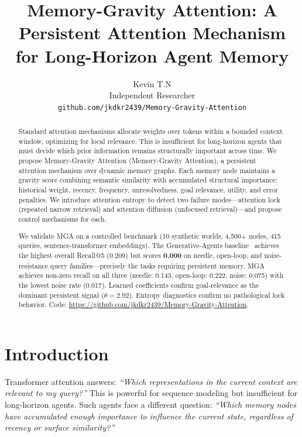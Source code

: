 \documentclass{article}
\title{Memory-Gravity Attention: A Persistent Attention Mechanism\\for Long-Horizon Agent Memory}
\author{
  Kevin T.N \\
  Independent Researcher \\
  \texttt{github.com/jkdkr2439/Memory-Gravity-Attention}
}
\newcommand{\MGA}{Memory-Gravity Attention}
\begin{document}
\maketitle

\begin{abstract}
Standard attention mechanisms allocate weights over tokens within a bounded context window, optimizing for local relevance. This is insufficient for long-horizon agents that must decide which prior information remains structurally important across time. We propose \MGA{} (\MGA{}), a persistent attention mechanism over dynamic memory graphs. Each memory node maintains a gravity score combining semantic similarity with accumulated structural importance: historical weight, recency, frequency, unresolvedness, goal relevance, utility, and error penalties. We introduce attention entropy to detect two failure modes---attention lock (repeated narrow retrieval) and attention diffusion (unfocused retrieval)---and propose control mechanisms for each.

We validate MGA on a controlled benchmark (10 synthetic worlds, 4{,}500+ nodes, 415 queries, sentence-transformer embeddings). The Generative-Agents baseline~\citep{park2023generative} achieves the highest overall Recall@5 (0.209) but scores \textbf{0.000} on needle, open-loop, and noise-resistance query families---precisely the tasks requiring persistent memory. MGA achieves non-zero recall on all three (needle: 0.143, open-loop: 0.222, noise: 0.075) with the lowest noise rate (0.017). Learned coefficients confirm goal-relevance as the dominant persistent signal ($\theta = 2.92$). Entropy diagnostics confirm no pathological lock behavior. Code: \url{https://github.com/jkdkr2439/Memory-Gravity-Attention}.
\end{abstract}

\section{Introduction}

Transformer attention answers: \emph{``Which representations in the current context are relevant to my query?''} This is powerful for sequence modeling but insufficient for long-horizon agents. Such agents face a different question: \emph{``Which memory nodes have accumulated enough importance to influence the current state, regardless of recency or surface similarity?''}
\end{document}
